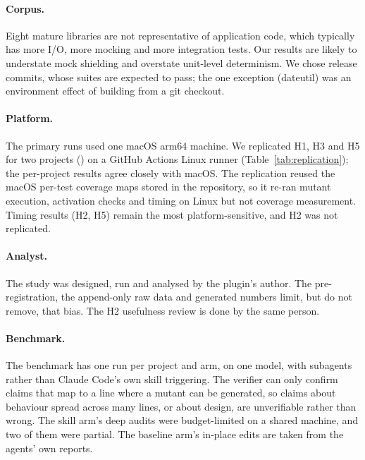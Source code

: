 \paragraph{Corpus.} Eight mature libraries are not representative of application code, which typically has more I/O, more mocking and more integration tests. Our results are likely to understate mock shielding and overstate unit-level determinism. We chose release commits, whose suites are expected to pass; the one exception (dateutil) was an environment effect of building from a git checkout.

\paragraph{Platform.} The primary runs used one macOS arm64 machine. We replicated H1, H3 and H5 for two projects (\ReplProjects) on a GitHub Actions Linux runner (Table~\ref{tab:replication}); the per-project results agree closely with macOS. The replication reused the macOS per-test coverage maps stored in the repository, so it re-ran mutant execution, activation checks and timing on Linux but not coverage measurement. Timing results (H2, H5) remain the most platform-sensitive, and H2 was not replicated.

\paragraph{Analyst.} The study was designed, run and analysed by the plugin's author. The pre-registration, the append-only raw data and generated numbers limit, but do not remove, that bias. The H2 usefulness review is done by the same person.

\paragraph{Benchmark.} The benchmark has one run per project and arm, on one model, with subagents rather than Claude Code's own skill triggering. The verifier can only confirm claims that map to a line where a mutant can be generated, so claims about behaviour spread across many lines, or about design, are unverifiable rather than wrong. The skill arm's deep audits were budget-limited on a shared machine, and two of them were partial. The baseline arm's in-place edits are taken from the agents' own reports.

